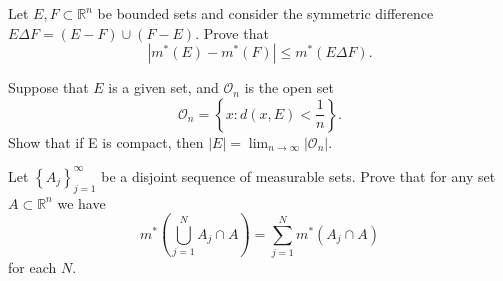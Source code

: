 \begin{solution}
\end{solution}

\pagebreak

\begin{problem}{4}
  Let $E,F \subset \mathbb{R}^{n}$ be bounded sets and consider the symmetric difference $E \Delta F = \left( E - F \right) \cup \left( F - E \right) $.
  Prove that
  \[
    \left| m^{*}(E) - m^{*}(F) \right| \leq m^{*}(E \Delta F)
  .\] 
\end{problem}


\begin{solution}
\end{solution}

\pagebreak

\begin{problem}{5}
  Suppose that $E$ is a given set, and $\mathcal{O}_{n}$ is the open set
  \[
  \mathcal{O}_{n} = \left\{ x : d(x,E) < \frac{1}{n} \right\}
  .\] 
  Show that if E is compact, then $|E| = \lim_{n \to \infty} \left| \mathcal{O}_{n} \right|$.
\end{problem}

\begin{solution}
\end{solution}

\pagebreak

\begin{problem}{6}
  Let $\left\{ A_{j} \right\}_{j=1}^{\infty}$ be a disjoint sequence of measurable sets.
  Prove that for any set $A \subset \mathbb{R}^{n}$ we have 
  \[
  m^{*}\left( \bigcup_{j=1}^{N} A_{j} \cap A  \right) = \sum_{j=1}^{N} m^{*}\left( A_{j} \cap A \right)
  \] 
  for each $N$.
\end{problem}

\begin{solution}
\end{solution}
